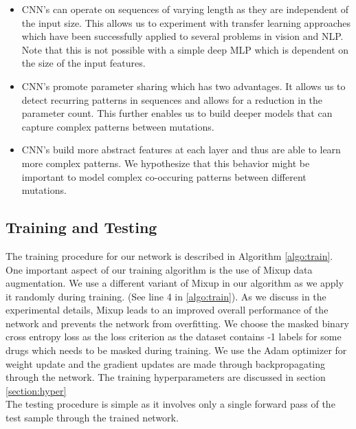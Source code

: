 \documentclass{article}
\begin{document}
\begin{itemize}
    \item CNN's can operate on sequences of varying length as they are independent of the input size. 
    This allows us to
    experiment with transfer learning approaches which have been successfully applied to several problems in 
    vision and
    NLP.
    Note that this is not possible with a simple deep MLP which is dependent on the size of the input features.
    \item CNN's promote parameter sharing which has two advantages. It allows us to detect recurring patterns in
    sequences and allows for a reduction in the parameter count. This further enables us to build deeper models that
    can capture complex patterns between mutations.
    \item CNN's build more abstract features at each layer and thus are able to learn more complex patterns. 
    We hypothesize
    that this behavior might be important to model complex co-occuring patterns between different mutations. 
\end{itemize}

\subsection{Training and Testing}

The training procedure for our network is described in Algorithm \ref{algo:train}. One
important aspect of our training algorithm is the use of Mixup \cite{DBLP:journals/corr/abs-1710-09412} 
data augmentation. We use a different variant of Mixup in our algorithm as we apply 
it randomly during training. (See line 4 in \ref{algo:train}).
As we discuss in the
experimental details, Mixup leads to an improved overall performance of the network and prevents the
network from overfitting. We choose the masked binary cross entropy loss as the loss criterion
as the dataset contains -1 labels for some drugs which needs to be masked during training.
We use the Adam \cite{kingma2017adam} optimizer for weight update and the gradient updates are made through backpropagating through
the network. The training hyperparameters are discussed in section \ref{section:hyper}\\
The testing procedure is simple as it involves only a single forward pass of the test sample through
the trained network.
\end{document}
